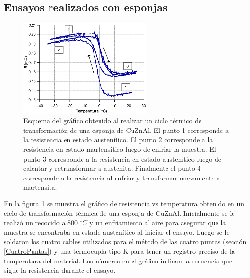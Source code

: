 \documentclass[a4paper,12pt,fleqn,twoside,openany]{book}
\begin{document}
% 

 
%  
  
  
\subsection{Ensayos realizados con esponjas}
 
 \begin{figure}[h]
 \centering
 \includegraphics[width=0.6\textwidth]{Img/Resultados/Resistencia/HistExplicacion.eps}
 \caption{Esquema del gráfico obtenido al realizar un ciclo térmico de transformación de una esponja de CuZnAl. El punto 1 corresponde a la resistencia en estado austenítico. El punto 2 corresponde a la resistencia en estado martensítico luego de enfriar la muestra. El punto 3 corresponde a la resistencia en estado austenítico luego de calentar y retransformar a austenita. Finalmente el punto 4 corresponde a la resistencia al enfriar y transformar nuevamente a martensita.} 
 \label{fig:HistExplicacion}
 \end{figure}

 
 En la figura \ref{fig:HistExplicacion} se muestra el gráfico de resistencia vs temperatura obtenido en un ciclo de transformación térmica de una esponja de CuZnAl. Inicialmente se le realizó un recocido a 800 $^\circ C$ y un enfriamiento al aire para asegurar que la muestra se encontraba en estado austenítico al iniciar el ensayo. Luego se le soldaron los cuatro cables utilizados para el método de las cuatro puntas (sección \ref{CuatroPuntas}) y una termocupla tipo K para tener un registro preciso de la temperatura del material. Los números en el gráfico indican la secuencia que sigue la resistencia durante el ensayo. 
 
\end{document}
